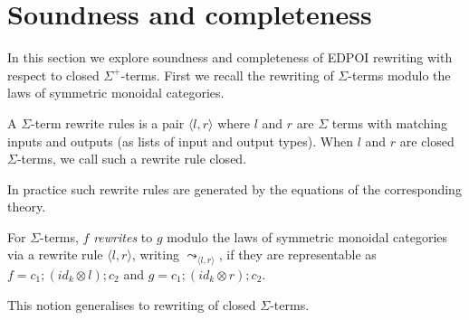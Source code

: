 \section{Soundness and completeness}

In this section we explore soundness and completeness of EDPOI rewriting with respect to closed $\Sigma^{+}$-terms.
First we recall the rewriting of $\Sigma$-terms modulo the laws of symmetric monoidal categories.

\begin{definition}
	A $\Sigma$-term rewrite rules is a pair $\langle l, r \rangle$ where $l$ and $r$ are $\Sigma$ terms with matching inputs and outputs (as lists of input and output types).
	When $l$ and $r$ are closed $\Sigma$-terms, we call such a rewrite rule closed.
\end{definition}

In practice such rewrite rules are generated by the equations of the corresponding theory.

\begin{definition}%
	\label{def:rewrite}
	For $\Sigma$-terms, $f$ \emph{rewrites} to $g$ modulo the laws of symmetric monoidal categories via a rewrite rule $\langle l, r \rangle$, writing $\leadsto_{\langle l, r \rangle}$, if they are representable as
	$
		f = c_{1};(id_{k} \otimes l);c_{2} $ and $ g = c_{1};(id_{k} \otimes r);c_{2}
	$.
\end{definition}
This notion generalises to rewriting of closed $\Sigma$-terms.

